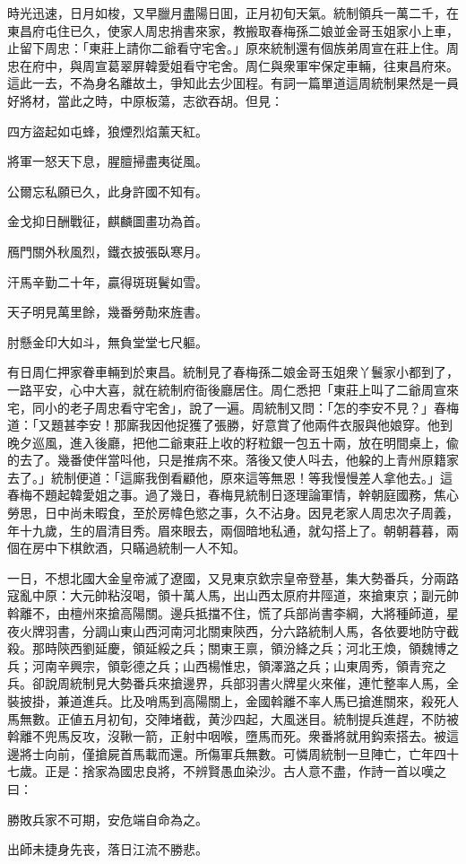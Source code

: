 時光迅速，日月如梭，又早臘月盡陽日囬，正月初旬天氣。統制領兵一萬二千，在東昌府屯住已久，使家人周忠捎書來家，教搬取春梅孫二娘並金哥玉姐家小上車，止留下周忠：「東莊上請你二爺看守宅舍。」原來統制還有個族弟周宣在莊上住。周忠在府中，與周宣葛翠屏韓愛姐看守宅舍。周仁與衆軍牢保定車輛，往東昌府來。這此一去，不為身名離故土，爭知此去少囬程。有詞一篇單道這周統制果然是一員好將材，當此之時，中原板蕩，志欲吞胡。但見：
\begin{myquote}
四方盜起如屯蜂，狼煙烈焰薰天紅。

將軍一怒天下息，腥膻掃盡夷従風。

公爾忘私願已久，此身許國不知有。

金戈抑日酬戰征，麒麟圖畫功為首。

鴈門關外秋風烈，鐵衣披張臥寒月。

汗馬辛勤二十年，贏得斑斑鬢如雪。

天子明見萬里餘，幾番勞勣來旌書。

肘懸金印大如斗，無負堂堂七尺軀。
\end{myquote}

有日周仁押家眷車輛到於東昌。統制見了春梅孫二娘金哥玉姐衆丫鬟家小都到了，一路平安，心中大喜，就在統制府衙後廳居住。周仁悉把「東莊上叫了二爺周宣來宅，同小的老子周忠看守宅舍」，說了一遍。周統制又問：「怎的李安不見？」春梅道：「又題甚李安！那廝我因他捉獲了張勝，好意賞了他兩件衣服與他娘穿。他到晚夕巡風，進入後廳，把他二爺東莊上收的籽粒銀一包五十兩，放在明間桌上，偸的去了。幾番使伴當呌他，只是推病不來。落後又使人呌去，他躱的上青州原籍家去了。」統制便道：「這廝我倒看顧他，原來這等無恩！等我慢慢差人拿他去。」這春梅不題起韓愛姐之事。過了幾日，春梅見統制日逐理論軍情，幹朝庭國務，焦心勞思，日中尚未暇食，至於房幃色慾之事，久不沾身。因見老家人周忠次子周義，年十九歲，生的眉清目秀。眉來眼去，兩個暗地私通，就勾搭上了。朝朝暮暮，兩個在房中下棋飲酒，只瞞過統制一人不知。

一日，不想北國大金皇帝滅了遼國，又見東京欽宗皇帝登基，集大勢番兵，分兩路寇亂中原：大元帥粘沒喝，領十萬人馬，出山西太原府井陘道，來搶東京；副元帥斡離不，由檀州來搶高陽關。邊兵抵擋不住，慌了兵部尚書李綱，大將種師道，星夜火牌羽書，分調山東山西河南河北關東陝西，分六路統制人馬，各依要地防守截殺。那時陝西劉延慶，領延綏之兵；關東王禀，領汾絳之兵；河北王煥，領魏博之兵；河南辛興宗，領彰德之兵；山西楊惟忠，領澤潞之兵；山東周秀，領青兖之兵。卻說周統制見大勢番兵來搶邊界，兵部羽書火牌星火來催，連忙整率人馬，全裝披掛，兼道進兵。比及哨馬到高陽關上，金國斡離不率人馬已搶進關來，殺死人馬無數。正値五月初旬，交陣堵截，黄沙四起，大風迷目。統制提兵進趕，不防被斡離不兜馬反攻，沒鞦一箭，正射中咽喉，墮馬而死。衆番將就用鈎索搭去。被這邊將士向前，僅搶屍首馬載而還。所傷軍兵無數。可憐周統制一旦陣亡，亡年四十七歲。正是：捨家為國忠良將，不辨賢愚血染沙。古人意不盡，作詩一首以嘆之曰：
\begin{myquote}
勝敗兵家不可期，安危端自命為之。

出師未捷身先丧，落日江流不勝悲。
\end{myquote}

